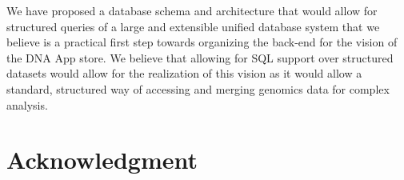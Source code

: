 \documentclass[conference,twocolumn,10pt]{IEEEtran}
\begin{document}
We have proposed a database schema and architecture that would allow for structured queries of a large and extensible unified database system that we believe is a practical first step towards organizing the back-end for the vision of the DNA App store. We believe that allowing for SQL support over structured datasets would allow for the realization of this vision as it would allow a standard, structured way of accessing and merging genomics data for complex analysis.



\section*{Acknowledgment}






\end{document}
